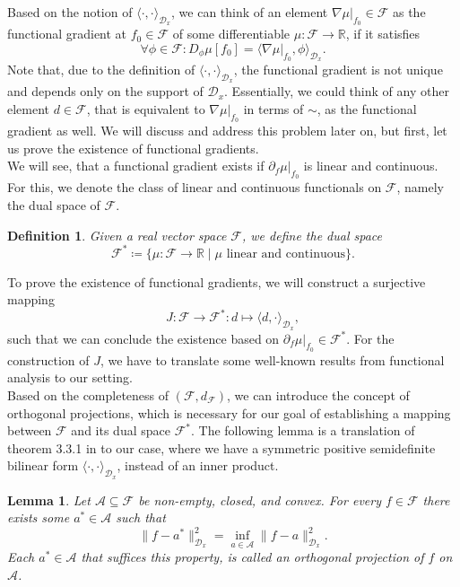 \documentclass[11pt, a4paper]{article}
\newtheorem{lemma}[theorem]{Lemma}
\newtheorem{definition}[theorem]{Definition}
\newcommand{\R}{\mathbb{R}}
\newcommand{\A}{\mathcal{A}}
\newcommand{\D}{\mathcal{D}}
\newcommand{\F}{\mathcal{F}}
\begin{document}
Based on the notion of $\langle \cdot, \cdot \rangle_{\D_x}$, we can think of an element $\nabla \mu |_{f_0} \in \F$ as the functional gradient at $f_0 \in \F$ of some differentiable $\mu : \F \to \R$, if it satisfies
\[ \forall \phi \in \F : D_\phi\mu[f_0] = \big \langle \nabla \mu |_{f_0}, \phi \big \rangle_{\D_x}. \]
Note that, due to the definition of $\langle \cdot, \cdot \rangle_{\D_x}$, the functional gradient is not unique and depends only on the support of $\D_x$. Essentially, we could think of any other element $d \in \F$, that is equivalent to $\nabla \mu |_{f_0}$ in terms of $\sim$, as the functional gradient as well. We will discuss and address this problem later on, but first, let us prove the existence of functional gradients. \\

We will see, that a functional gradient exists if $\partial_f \mu |_{f_0}$ is linear and continuous. For this, we denote the class of linear and continuous functionals on $\F$, namely the dual space of $\F$.

\begin{definition}
Given a real vector space $\F$, we define the dual space
\[ \F^* \coloneq \Big \{ \mu : \F \to \R \mid \mu \text{ linear and continuous} \Big \}. \]
\end{definition}

To prove the existence of functional gradients, we will construct a surjective mapping 
\[ J: \F \to \F^* : d \mapsto \langle d, \cdot \rangle_{\D_x}, \]
such that we can conclude the existence based on $\partial_f \mu |_{f_0} \in \F^*$. For the construction of $J$, we have to translate some well-known results from functional analysis to our setting. \\

Based on the completeness of $(\F, d_\F)$, we can introduce the concept of orthogonal projections, which is necessary for our goal of establishing a mapping between $\F$ and its dual space $\F^*$. The following lemma is a translation of theorem 3.3.1 in \cite{FunctionalAnalysis} to our case, where we have a symmetric positive semidefinite bilinear form $\langle \cdot, \cdot \rangle_{\D_x}$, instead of an inner product.

\begin{lemma} \label{lem:projection}
Let $\A \subseteq \F$ be non-empty, closed, and convex. For every $f \in \F$ there exists some $a^* \in \A$ such that 
\[ \big \| f - a^* \big \|_{\D_x}^2 = \inf_{a \in \A} \big \| f - a \big \|_{\D_x}^2. \]
Each $a^* \in \A$ that suffices this property, is called an orthogonal projection of $f$ on $\A$.
\end{lemma}
\end{document}

